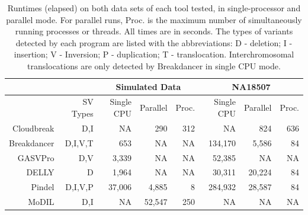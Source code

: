 \documentclass[11pt]{article}
\begin{document}
\begin{table}[h]
\begin{center}
\begin{tabular}{r|r|rrr|rrr}
\multicolumn{2}{c}{}  & \multicolumn{3}{c}{Simulated Data} & \multicolumn{3}{c}{NA18507} \\
\hline
 & SV Types &  Single CPU & Parallel & Proc. &  Single CPU & Parallel & Proc.  \\ 
  \hline
  Cloudbreak & D,I &   NA    & 290 & 312    & NA         & 824 & 636 \\ 
  Breakdancer & D,I,V,T &  653   & NA       & NA          & 134,170 &  5,586 & 84 \\
  GASVPro & D,V   &  3,339  & NA       & NA         & 52,385  & NA & NA \\
  DELLY & D         &  1,964 & NA          & NA      & 30,311  & 20,224 & 84 \\
  Pindel & D,I,V,P         & 37,006 &  4,885     & 8          &  284,932  & 28,587 & 84 \\ 
  MoDIL & D,I        &  NA      & 52,547 & 250 & NA         & NA  & NA\\ 
   \hline
\end{tabular}
\end{center}
\caption{Runtimes (elapsed) on both data sets of each tool tested, in single-processor and parallel mode. For parallel runs, Proc. is the maximum number of simultaneously running processes or threads. All times are in seconds. The types of variants detected by each program are listed with the abbreviations: D - deletion; I - insertion; V - Inversion; P - duplication; T - translocation. Interchromosomal translocations are only detected by Breakdancer in single CPU mode. }
\label{runtimes}
\end{table}

\clearpage
\end{document}
